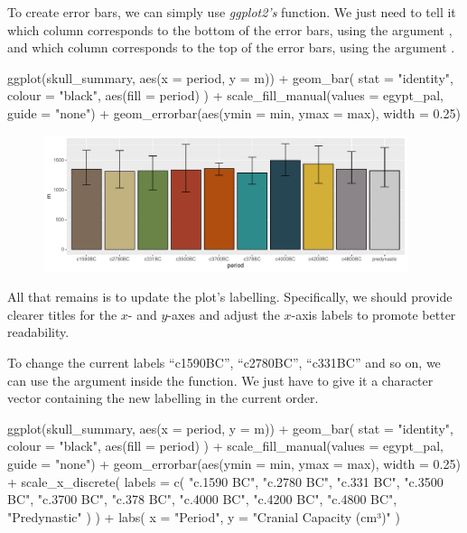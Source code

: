 To create error bars, we can simply use \textit{ggplot2's}  function. We just need to tell it which column corresponds to the bottom of the error bars, using the argument , and which column corresponds to the top of the error bars, using the argument .

\begin{inR}
ggplot(skull_summary, aes(x = period, y = m)) +
  geom_bar(
    stat = "identity",
    colour = "black",
    aes(fill = period)
  ) +
  scale_fill_manual(values = egypt_pal, guide = "none") +
  geom_errorbar(aes(ymin = min, ymax = max), width = 0.25)
\end{inR}

\vspace{2em}

\begin{figure}[H]
\includegraphics[width = 0.95\textwidth]{graphics/ch3Figs/bar_4.pdf}
\end{figure}

All that remains is to update the plot’s labelling. Specifically, we should provide clearer titles for the $x$- and $y$-axes and adjust the $x$-axis labels to promote better readability.

To change the current labels ``c1590BC'', ``c2780BC'', ``c331BC'' and so on, we can use the  argument inside the  function. We just have to give it a character vector containing the new labelling in the current order.

\begin{inR}
ggplot(skull_summary, aes(x = period, y = m)) +
  geom_bar(
    stat = "identity",
    colour = "black",
    aes(fill = period)
  ) +
  scale_fill_manual(values = egypt_pal, guide = "none") +
  geom_errorbar(aes(ymin = min, ymax = max), width = 0.25) +
  scale_x_discrete(
    labels = c(
      "c.1590 BC", "c.2780 BC", "c.331 BC", "c.3500 BC", "c.3700 BC",
      "c.378 BC", "c.4000 BC", "c.4200 BC", "c.4800 BC", "Predynastic"
    )
  ) +
  labs(
    x = "Period",
    y = "Cranial Capacity (cm³)"
  )
\end{inR}

